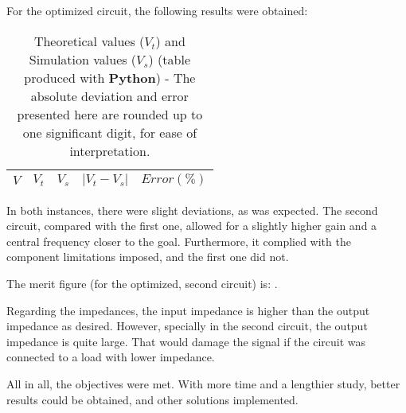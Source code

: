 For the optimized circuit, the following results were obtained:

\begin{table}[H]
  \centering
  \begin{tabular}{|c|c|c|c|c|}
    \hline
        $V$ & $V_t$ & $V_s$ & $|V_t-V_s|$ & $Error (\%)$ \\
        \hline
        \hline
        
        \hline
  \end{tabular}
  \caption{Theoretical values ($V_t$) and Simulation values ($V_s$) (table produced with {\bf Python})  - The absolute deviation and error presented here are rounded up to one significant digit, for ease of interpretation.}
  \label{error2_res}
\end{table}

In both instances, there were slight deviations, as was expected. The second circuit, compared with the first one, allowed for a slightly higher gain and a central frequency closer to the goal. Furthermore, it complied with the component limitations imposed, and the first one did not.

The merit figure (for the optimized, second circuit) is: .

Regarding the impedances, the input impedance is higher than the output impedance as desired. However, specially in the second circuit, the output impedance is quite large. That would damage the signal if the circuit was connected to a load with lower impedance.  

All in all, the objectives were met. With more time and a lengthier study, better results could be obtained, and other solutions implemented.
